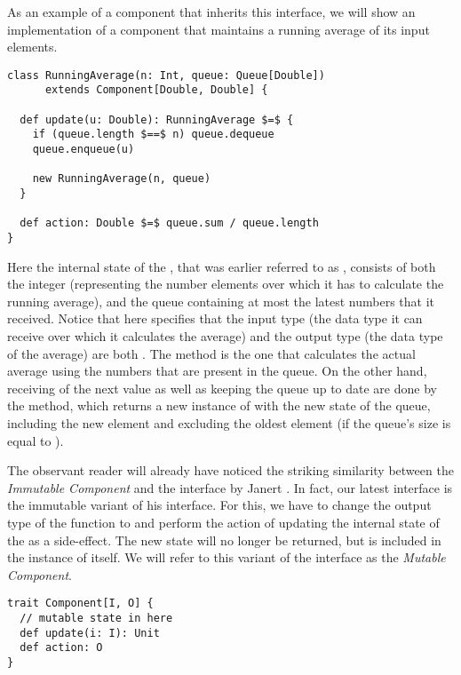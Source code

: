 As an example of a component that inherits this interface, we will show an implementation of a component that maintains a running average of its input elements.

\begin{lstlisting}[style=ScalaStyle]
class RunningAverage(n: Int, queue: Queue[Double])
      extends Component[Double, Double] {

  def update(u: Double): RunningAverage $=$ {
    if (queue.length $==$ n) queue.dequeue
    queue.enqueue(u)

    new RunningAverage(n, queue)
  }

  def action: Double $=$ queue.sum / queue.length
}
\end{lstlisting}

Here the internal state of the \comp, that was earlier referred to as , consists of both the integer  (representing the number elements over which it has to calculate the running average), and the queue containing at most the latest  numbers that it received. Notice that  here specifies that the input type (the data type it can receive over which it calculates the average) and the output type (the data type of the average) are both . The  method is the one that calculates the actual average using the numbers that are present in the queue. On the other hand, receiving of the next value as well as keeping the queue up to date are done by the  method, which returns a new instance of  with the new state of the queue, including the new element and excluding the oldest element (if the queue's size is equal to ).

The observant reader will already have noticed the striking similarity between the \textit{Immutable Component} and the  interface by Janert \cite{janert2013-feedback}. In fact, our latest \comp interface is the immutable variant of his interface. For this, we have to change the output type of the  function to  and perform the action of updating the internal state of the \comp as a side-effect. The new state will no longer be returned, but is included in the instance of \comp itself. We will refer to this variant of the interface as the \textit{Mutable Component}.

\begin{lstlisting}[style=InlineScalaStyle]
trait Component[I, O] {
  // mutable state in here
  def update(i: I): Unit
  def action: O
}
\end{lstlisting}

